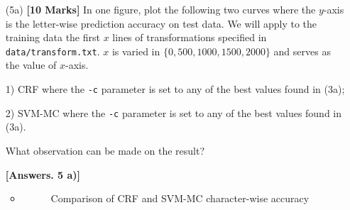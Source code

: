 \documentclass[11pt]{report}
\begin{document}
\begin{itemize}
	\item[(5a)] {\bf [10 Marks]} In one figure, plot the following two curves where the $y$-axis is the letter-wise prediction accuracy on test data.  We will apply to the training data the first $x$ lines of transformations specified in \verb#data/transform.txt#.  $x$ is varied in $\{0, 500, 1000, 1500, 2000\}$ and serves as the value of $x$-axis.
	
	1) CRF where the \verb#-c# parameter is set to any of the best values found in (3a);
	
	2) SVM-MC where the \verb#-c# parameter is set to any of the best values found in (3a).
	
	What observation can be made on the result?


	{\bf [Answers. 5 a)]} 
	\begin{itemize}
	    \item 
	    	\begin{figure}[H]
            	\centering
                \caption{Comparison of CRF and SVM-MC character-wise accuracy}
            	\label{fig:compare_optimizer}
            \end{figure}
	\end{itemize}
	

\end{itemize}
\end{document}
